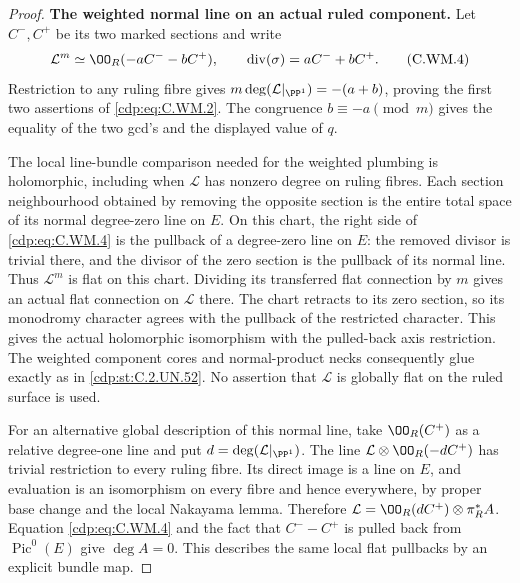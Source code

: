 \begin{proof}
\par\medskip\noindent\textbf{The weighted normal line on an actual ruled component.}
Let $C^-,C^+$ be its two marked sections and write
\[
  \mathcal L^{m}
       \simeq \OO_R(-aC^- -bC^+),\qquad
       \operatorname{div}(\sigma)=aC^-+bC^+.
\tag{C.WM.4}\label{cdp:eq:C.WM.4}
\]
Restriction to any ruling fibre gives
$m\deg(\mathcal L|_{\PP^1})=-(a+b)$,
proving the first two assertions of \eqref{cdp:eq:C.WM.2}.
The congruence $b\equiv-a\pmod m$ gives
the equality of the two gcd's and the displayed
value of $q$.

The local line-bundle comparison needed for the weighted
plumbing is holomorphic, including when $\mathcal L$
has nonzero degree on ruling fibres.
Each section neighbourhood obtained by removing the
opposite section is the entire total space of its
normal degree-zero line on $E$.
On this chart, the right side of \eqref{cdp:eq:C.WM.4} is the
pullback of a degree-zero line on $E$:
the removed divisor is trivial there, and the divisor
of the zero section is the pullback of its normal line.
Thus $\mathcal L^m$ is flat on this chart.
Dividing its transferred flat connection by $m$
gives an actual flat connection on $\mathcal L$ there.
The chart retracts to its zero section, so its
monodromy character agrees with the pullback of
the restricted character. This gives the actual
holomorphic isomorphism with the pulled-back
axis restriction. The weighted component cores
and normal-product necks consequently glue exactly
as in \ref{cdp:st:C.2.UN.52}. No assertion that $\mathcal L$ is
globally flat on the ruled surface is used.

For an alternative global description of this
normal line, take $\OO_R(C^+)$ as a relative
degree-one line and put
$d=\deg(\mathcal L|_{\PP^1})$.
The line $\mathcal L\otimes\OO_R(-dC^+)$
has trivial restriction to every ruling fibre.
Its direct image is a line on $E$, and evaluation
is an isomorphism on every fibre and hence everywhere,
by proper base change and the local Nakayama lemma.
Therefore
$\mathcal L=\OO_R(dC^+)\otimes\pi_R^*A$.
Equation \eqref{cdp:eq:C.WM.4} and the fact that
$C^--C^+$ is pulled back from $\operatorname{Pic}^0(E)$
give $\deg A=0$. This describes the same local
flat pullbacks by an explicit bundle map.


\end{proof}
